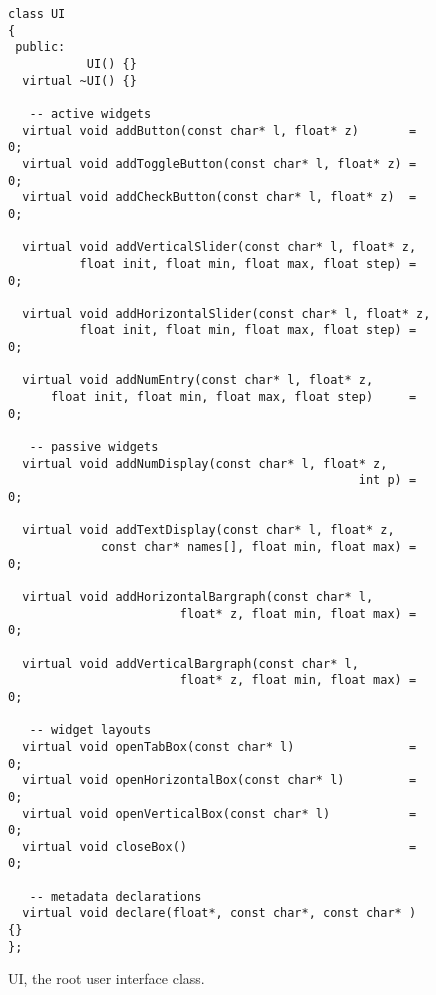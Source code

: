 \begin{figure}[htdp]
\begin{center}
\begin{lstlisting}[basicstyle=\ttfamily\footnotesize\color{yotxt}]
class UI
{
 public:
           UI() {}
  virtual ~UI() {}

   -- active widgets
  virtual void addButton(const char* l, float* z)       = 0;
  virtual void addToggleButton(const char* l, float* z) = 0;
  virtual void addCheckButton(const char* l, float* z)  = 0;
  
  virtual void addVerticalSlider(const char* l, float* z, 
          float init, float min, float max, float step) = 0;
          
  virtual void addHorizontalSlider(const char* l, float* z, 
          float init, float min, float max, float step) = 0;
          
  virtual void addNumEntry(const char* l, float* z, 
      float init, float min, float max, float step)     = 0;
      
   -- passive widgets
  virtual void addNumDisplay(const char* l, float* z,
                                                 int p) = 0;
                                                 
  virtual void addTextDisplay(const char* l, float* z, 
             const char* names[], float min, float max) = 0;
             
  virtual void addHorizontalBargraph(const char* l,
                        float* z, float min, float max) = 0;
                        
  virtual void addVerticalBargraph(const char* l, 
                        float* z, float min, float max) = 0; 
                        
   -- widget layouts
  virtual void openTabBox(const char* l)                = 0;
  virtual void openHorizontalBox(const char* l)         = 0;
  virtual void openVerticalBox(const char* l)           = 0;
  virtual void closeBox()                               = 0;
        
   -- metadata declarations
  virtual void declare(float*, const char*, const char* ) {}
};
\end{lstlisting} 
\end{center}
\caption{UI, the root user interface class.}
\label{tab:ui}
\end{figure}

